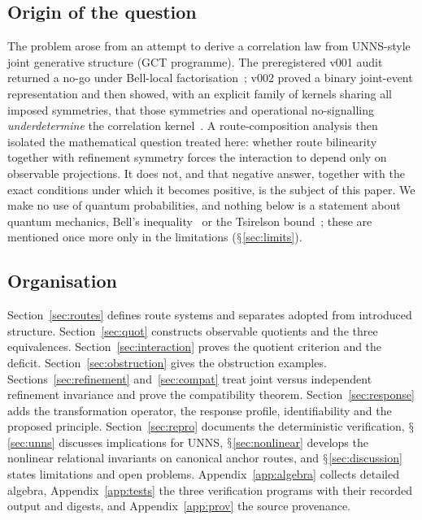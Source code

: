 \documentclass[11pt,a4paper]{article}
\renewcommand{\S}{\ensuremath{\mathsection}}
\theoremstyle{plain}
\theoremstyle{definition}
\begin{document}
\subsection{Origin of the question}
The problem arose from an attempt to derive a correlation law from UNNS-style joint generative structure (GCT programme).
The preregistered v001 audit returned a no-go under Bell-local factorisation~\cite{G1,G6}; v002 proved a binary joint-event representation and then showed, with an explicit family of kernels sharing all imposed symmetries, that those symmetries and operational no-signalling \emph{underdetermine} the correlation kernel~\cite{G2,G4}.
A route-composition analysis then isolated the mathematical question treated here: whether route bilinearity together with refinement symmetry forces the interaction to depend only on observable projections.
It does not, and that negative answer, together with the exact conditions under which it becomes positive, is the subject of this paper.
We make no use of quantum probabilities, and nothing below is a statement about quantum mechanics, Bell's inequality~\cite{Bel64,CHSH69} or the Tsirelson bound~\cite{Tsi80}; these are mentioned once more only in the limitations (\S\ref{sec:limits}).

\subsection{Organisation}
Section~\ref{sec:routes} defines route systems and separates adopted from introduced structure.
Section~\ref{sec:quot} constructs observable quotients and the three equivalences.
Section~\ref{sec:interaction} proves the quotient criterion and the deficit.
Section~\ref{sec:obstruction} gives the obstruction examples.
Sections~\ref{sec:refinement} and~\ref{sec:compat} treat joint versus independent refinement invariance and prove the compatibility theorem.
Section~\ref{sec:response} adds the transformation operator, the response profile, identifiability and the proposed principle.
Section~\ref{sec:repro} documents the deterministic verification, \S\ref{sec:unns} discusses implications for UNNS, \S\ref{sec:nonlinear} develops the nonlinear relational invariants on canonical anchor routes, and \S\ref{sec:discussion} states limitations and open problems.
Appendix~\ref{app:algebra} collects detailed algebra, Appendix~\ref{app:tests} the three verification programs with their recorded output and digests, and Appendix~\ref{app:prov} the source provenance.

\end{document}
